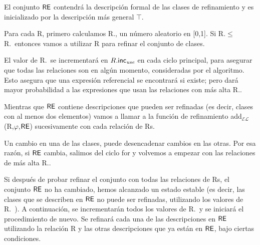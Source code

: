 

El conjunto $\textsf{RE}$ contendr\'a la descripci\'on formal de las clases de refinamiento
y es inicializado por la descripci\'on m\'as general $\top$.

Para cada R, primero calculamos R.\randomuse, un n\'umero aleatorio en [0,1].
Si R.\randomuse $\le$ R.\puse\ entonces vamos a utilizar R para refinar el conjunto de
clases. 

El valor de R.\puse\ se incrementar\'a en $R.\textsf{inc}_\emph{use}$
en cada ciclo principal, para asegurar que todas las relaciones son en alg\'un momento,
consideradas por el algoritmo. Esto asegura que una expresi\'on referencial
se encontrar\'a si existe; pero dar\'a mayor probabilidad a las expresiones
que usan las relaciones con m\'as alta R.\puse.
 
Mientras que $\textsf{RE}$ contiene descripciones que pueden ser refinadas (es decir, clases
con al menos dos elementos) vamos a llamar a la funci\'on de refinamiento
add$_\mathcal{EL}$(R,$\varphi$,$\textsf{RE}$) sucesivamente con cada relaci\'on
de Rs.

 Un cambio en una de las clases, puede desencadenar cambios en
las otras. Por esa raz\'on, si $\textsf{RE}$ cambia, salimos del ciclo for y volvemos a
empezar con las relaciones de m\'as alta R.\puse. 

Si despu\'es de probar refinar el conjunto con todas las relaciones de Rs, el conjunto $\textsf{RE}$ no ha
cambiado, hemos alcanzado un estado estable (es decir, las clases que se describen
en $\textsf{RE}$ no puede ser refinadas, utilizando los valores de R.\puse\ ). 
A continuaci\'on, se incrementar\'an todos los valores de R.\puse\ y se iniciar\'a el
procedimiento de nuevo.
Se refinar\'a cada una de las descripciones
en $\textsf{RE}$ utilizando la relaci\'on R y las otras descripciones que ya est\'an en
$\textsf{RE}$, bajo ciertas condiciones. 

